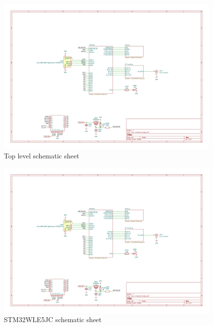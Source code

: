 \begin{figure}
    \includegraphics[page=1,angle=-90,width=\textwidth]{boards/v0.1/lora-module.pdf}
    \caption{\label{schematic:v0.1-1}Top level schematic sheet}
\end{figure}
\begin{figure}
    \includegraphics[page=2,angle=-90,width=\textwidth]{boards/v0.1/lora-module.pdf}
    \caption{\label{schematic:v0.1-2}STM32WLE5JC schematic sheet}
\end{figure}
